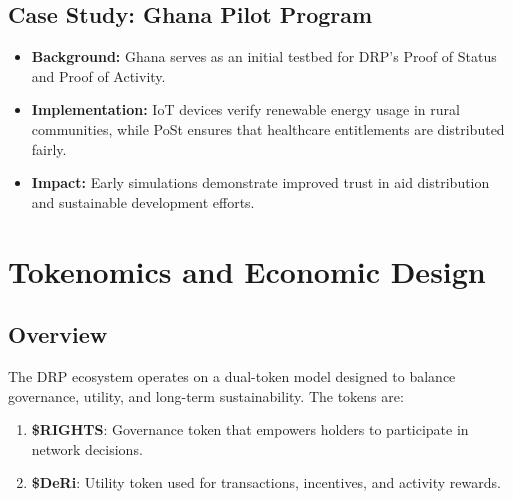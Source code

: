 \documentclass[11pt,a4paper]{article}
\begin{document}
\subsection{Case Study: Ghana Pilot Program}
\begin{itemize}
    \item \textbf{Background:} Ghana serves as an initial testbed for DRP’s Proof of Status and Proof of Activity.
    \item \textbf{Implementation:} IoT devices verify renewable energy usage in rural communities, while PoSt ensures that healthcare entitlements are distributed fairly.
    \item \textbf{Impact:} Early simulations demonstrate improved trust in aid distribution and sustainable development efforts.
\end{itemize}

\section{Tokenomics and Economic Design}

\subsection{Overview}
The DRP ecosystem operates on a dual-token model designed to balance governance, utility, and long-term sustainability. The tokens are:  
\begin{enumerate}
    \item \textbf{\$RIGHTS}: Governance token that empowers holders to participate in network decisions.  
    \item \textbf{\$DeRi}: Utility token used for transactions, incentives, and activity rewards.  
\end{enumerate}
\end{document}
